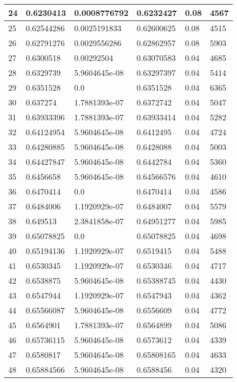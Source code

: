 \begin{longtable}{|l|l|l|l|l|l|}
24 & 0.6230413 & 0.0008776792 & 0.6232427 & 0.08 & 4567 \\ \hline 
25 & 0.62544286 & 0.0025191833 & 0.62600625 & 0.08 & 4515 \\ \hline 
26 & 0.62791276 & 0.0029556286 & 0.62862957 & 0.08 & 5903 \\ \hline 
27 & 0.6300518 & 0.00292504 & 0.63070583 & 0.04 & 4685 \\ \hline 
28 & 0.6329739 & 5.9604645e-08 & 0.63297397 & 0.04 & 5414 \\ \hline 
29 & 0.6351528 & 0.0 & 0.6351528 & 0.04 & 6365 \\ \hline 
30 & 0.637274 & 1.7881393e-07 & 0.6372742 & 0.04 & 5047 \\ \hline 
31 & 0.63933396 & 1.7881393e-07 & 0.63933414 & 0.04 & 5282 \\ \hline 
32 & 0.64124954 & 5.9604645e-08 & 0.6412495 & 0.04 & 4724 \\ \hline 
33 & 0.64280885 & 5.9604645e-08 & 0.6428088 & 0.04 & 5003 \\ \hline 
34 & 0.64427847 & 5.9604645e-08 & 0.6442784 & 0.04 & 5360 \\ \hline 
35 & 0.6456658 & 5.9604645e-08 & 0.64566576 & 0.04 & 4610 \\ \hline 
36 & 0.6470414 & 0.0 & 0.6470414 & 0.04 & 4586 \\ \hline 
37 & 0.6484006 & 1.1920929e-07 & 0.6484007 & 0.04 & 5579 \\ \hline 
38 & 0.649513 & 2.3841858e-07 & 0.64951277 & 0.04 & 5985 \\ \hline 
39 & 0.65078825 & 0.0 & 0.65078825 & 0.04 & 4698 \\ \hline 
40 & 0.65194136 & 1.1920929e-07 & 0.6519415 & 0.04 & 5488 \\ \hline 
41 & 0.6530345 & 1.1920929e-07 & 0.6530346 & 0.04 & 4717 \\ \hline 
42 & 0.6538875 & 5.9604645e-08 & 0.65388745 & 0.04 & 4430 \\ \hline 
43 & 0.6547944 & 1.1920929e-07 & 0.6547943 & 0.04 & 4362 \\ \hline 
44 & 0.65566087 & 5.9604645e-08 & 0.6556609 & 0.04 & 4772 \\ \hline 
45 & 0.6564901 & 1.7881393e-07 & 0.6564899 & 0.04 & 5086 \\ \hline 
46 & 0.65736115 & 5.9604645e-08 & 0.6573612 & 0.04 & 4339 \\ \hline 
47 & 0.6580817 & 5.9604645e-08 & 0.65808165 & 0.04 & 4633 \\ \hline 
48 & 0.65884566 & 5.9604645e-08 & 0.6588456 & 0.04 & 4320 \\ \hline 

\end{longtable}

